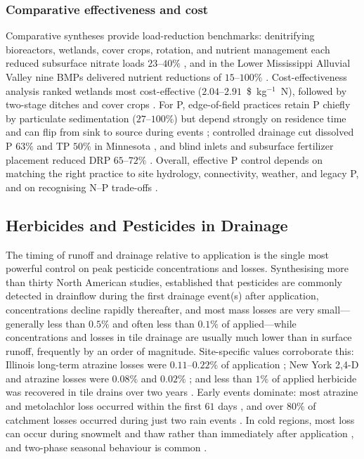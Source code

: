 \documentclass[11pt]{article}
\begin{document}
\subsubsection{Comparative effectiveness and cost}

Comparative syntheses provide load-reduction benchmarks: denitrifying
bioreactors, wetlands, cover crops, rotation, and nutrient management each
reduced subsurface nitrate loads $23$--$40\%$ \parencite{Yuan2022}, and in the
Lower Mississippi Alluvial Valley nine BMPs delivered nutrient reductions of
$15$--$100\%$ \parencite{Kröger2012}. Cost-effectiveness analysis ranked
wetlands most cost-effective ($2.04$--$2.91$~\$~kg$^{-1}$~N), followed by
two-stage ditches and cover crops \parencite{Roley2016,Messer2021}. For P,
edge-of-field practices retain P chiefly by particulate sedimentation
($27$--$100\%$) but depend strongly on residence time and can flip from sink
to source during events \parencite{Mendes2020,Kröger2013,Singh2020c};
controlled drainage cut dissolved P $63\%$ and TP $50\%$ in Minnesota
\parencite{Kröger2013,Nash2015c}, and blind inlets and subsurface fertilizer
placement reduced DRP $65$--$72\%$ \parencite{Kröger2013,Wilson2019,Sharpley2019}.
Overall, effective P control depends on matching the right practice to site
hydrology, connectivity, weather, and legacy P, and on recognising N--P
trade-offs \parencite{King2015,Ni2020,Baulch2019}.

\subsection{Herbicides and Pesticides in Drainage}

The timing of runoff and drainage relative to application is the single most
powerful control on peak pesticide concentrations and losses. Synthesising
more than thirty North American studies, \textcite{Kladivko2001} established
that pesticides are commonly detected in drainflow during the first drainage
event(s) after application, concentrations decline rapidly thereafter, and
most mass losses are very small---generally less than $0.5\%$ and often less
than $0.1\%$ of applied---while concentrations and losses in tile drainage are
usually much lower than in surface runoff, frequently by an order of
magnitude. Site-specific values corroborate this: Illinois long-term atrazine
losses were $0.11$--$0.22\%$ of application \parencite{Kalita2006}; New York
2,4-D and atrazine losses were $0.08\%$ and $0.02\%$ \parencite{Shalit1996};
and less than $1\%$ of applied herbicide was recovered in tile drains over two
years \parencite{Fortin2002,Siimes2006}. Early events dominate: most atrazine
and metolachlor loss occurred within the first $61$ days
\parencite{SOUTHWICK1990}, and over $80\%$ of catchment losses occurred during
just two rain events \parencite{Leu2004}. In cold regions, most loss can occur
during snowmelt and thaw rather than immediately after application
\parencite{Siimes2006}, and two-phase seasonal behaviour is common
\parencite{Novak2001,Dousset2004}.
\end{document}
